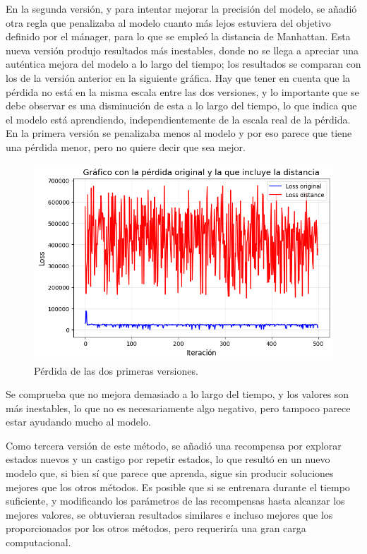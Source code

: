 \documentclass[letterpaper]{article} %
\begin{document}
En la segunda versión, y para intentar mejorar la precisión del modelo, se añadió otra regla que penalizaba al modelo cuanto más lejos estuviera del objetivo definido por el mánager, para lo que se empleó la distancia de Manhattan. Esta nueva versión 
produjo resultados más inestables, donde no se llega a apreciar una auténtica mejora del modelo a lo largo del tiempo; los resultados se comparan con los de la versión anterior en la siguiente gráfica. Hay que tener en cuenta que la pérdida no está
en la misma escala entre las dos versiones, y lo importante que se debe observar es una disminución de esta a lo largo del tiempo, lo que indica que el modelo está aprendiendo, independientemente de la escala real de la pérdida. En la primera versión se 
penalizaba menos al modelo y por eso parece que tiene una pérdida menor, pero no quiere decir que sea mejor.

\begin{figure}[H]
    \centering
    \includegraphics[width=0.9\columnwidth]{FuN_2.png}
    \caption{Pérdida de las dos primeras versiones.\label{fig:FuN4}}
\end{figure}

Se comprueba que no mejora demasiado a lo largo del tiempo, y los valores son más inestables, lo que no es necesariamente algo negativo, pero tampoco parece estar ayudando mucho al modelo.

Como tercera versión de este método, se añadió una recompensa por explorar estados nuevos y un castigo por repetir estados, lo que resultó en un nuevo modelo que, si bien sí que parece que aprenda, sigue sin producir soluciones mejores que los otros métodos. Es posible que si se entrenara durante el 
tiempo suficiente, y modificando los parámetros de las recompensas hasta alcanzar los mejores valores, se obtuvieran resultados similares e incluso mejores que los proporcionados por los otros métodos, pero requeriría una gran carga computacional.
\end{document}
